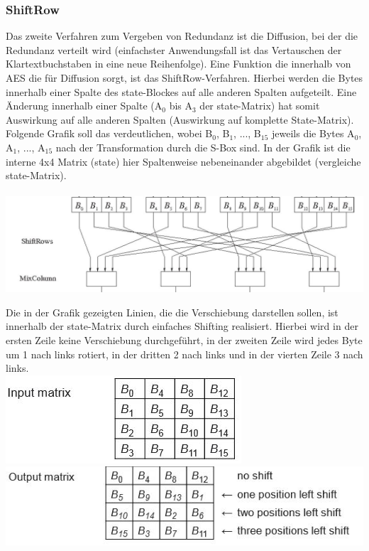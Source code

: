 \documentclass[10pt, a4paper,headsepline,pointednumbers]{scrreprt}
\begin{document}
\subsubsection{ShiftRow}
Das zweite Verfahren zum Vergeben von Redundanz ist die Diffusion, bei der die Redundanz verteilt wird (einfachster Anwendungsfall ist das Vertauschen der Klartextbuchstaben in eine neue Reihenfolge). Eine Funktion die innerhalb von AES die für Diffusion sorgt, ist das ShiftRow-Verfahren. Hierbei werden die Bytes innerhalb einer Spalte des state-Blockes auf alle anderen Spalten aufgeteilt. Eine Änderung innerhalb einer Spalte (A$_{0}$ bis A$_{3}$ der state-Matrix) hat somit Auswirkung auf alle anderen Spalten (Auswirkung auf komplette State-Matrix). Folgende Grafik soll das verdeutlichen, wobei B$_{0}$, B$_{1}$, ..., B$_{15}$ jeweils die Bytes A$_{0}$, A$_{1}$, ..., A$_{15}$ nach der Transformation durch die S-Box sind. In der Grafik ist die interne 4x4 Matrix (state) hier Spaltenweise nebeneinander abgebildet (vergleiche state-Matrix).  \\ \\

\includegraphics[scale=0.5]{aes_Shift_Row.JPG} 
\hfill

Die in der Grafik gezeigten Linien, die die Verschiebung darstellen sollen, ist innerhalb der state-Matrix durch einfaches Shifting realisiert. Hierbei wird in der ersten Zeile keine Verschiebung durchgeführt, in der zweiten Zeile wird jedes Byte um 1 nach links rotiert, in der dritten 2 nach links und in der vierten Zeile 3 nach links. \\

\includegraphics[scale=0.5]{shift_row_before.JPG}
\includegraphics[scale=0.5]{shift_row_after.JPG} 
\hfill
\end{document}

